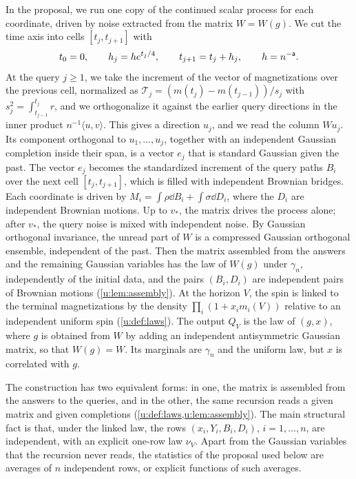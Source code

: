 In the proposal, we run one copy of the continued scalar process for each
coordinate, driven by noise extracted from the matrix $W=W(g)$. We cut the time
axis into cells $[t_j,t_{j+1}]$ with
\[
 t_0=0,\qquad h_j=he^{t_j/4},\qquad t_{j+1}=t_j+h_j,\qquad h=n^{-\mathsf{a}}.
\]
At the query $j\ge1$, we take the increment of the vector of magnetizations
over the previous cell, normalized as
$\mathcal T_j=(m(t_j)-m(t_{j-1}))/s_j$ with $s_j^2=\int_{t_{j-1}}^{t_j}r$, and
we orthogonalize it against the earlier query directions in the inner product
$n^{-1}\langle u,v\rangle$. This gives a direction $u_j$, and we read the
column $Wu_j$. Its component orthogonal to $u_1,\dots,u_j$, together with an
independent Gaussian completion inside their span, is a vector $e_j$ that is
standard Gaussian given the past. The vector $e_j$ becomes the standardized
increment of the query paths $B_i$ over the next cell $[t_j,t_{j+1}]$, which
is filled with independent Brownian bridges. Each coordinate is driven by
$M_i=\int\rho\dd B_i+\int\sigma\dd D_i$, where the $D_i$ are independent
Brownian motions. Up to $v_*$, the matrix drives the process alone; after
$v_*$, the query noise is mixed with independent noise. By Gaussian orthogonal
invariance, the unread part of $W$ is a compressed Gaussian orthogonal
ensemble, independent of the past. Then the matrix assembled from the answers
and the remaining Gaussian variables has the law of $W(g)$ under $\gamma_n$,
independently of the initial data, and the pairs $(B_i,D_i)$ are independent
pairs of Brownian motions (\cref{u:lem:assembly}). At the horizon $V$, the
spin is linked to the terminal magnetizations by the density
$\prod_i(1+x_im_i(V))$ relative to an independent uniform spin
(\cref{u:def:laws}). The output $Q_V$ is the law of $(g,x)$, where $g$ is
obtained from $W$ by adding an independent antisymmetric Gaussian matrix, so
that $W(g)=W$. Its marginals are
$\gamma_n$ and the uniform law, but $x$ is correlated with $g$.

The construction has two equivalent forms: in one, the matrix is assembled
from the answers to the queries, and in the other, the same recursion reads a
given matrix and given completions (\cref{u:def:laws,u:lem:assembly}). The main
structural fact is that, under the linked law, the rows $(x_i,Y_i,B_i,D_i)$,
$i=1,\dots,n$, are independent, with an explicit one-row law $\nu_V$.
Apart from the Gaussian variables that the recursion never reads, the
statistics of the proposal used below are averages of $n$ independent rows, or
explicit functions of such averages.

